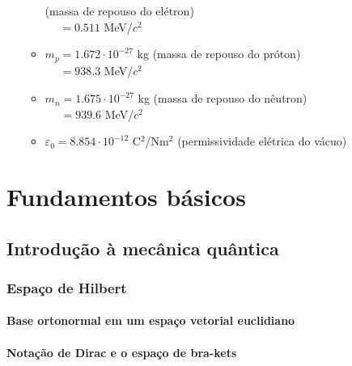 \documentclass{header}
\begin{document}
\begin{itemize}
\begin{itemize}
                \hfill (massa de repouso do elétron) \\
                $\phantom{m_{e}} = 0.511$ MeV/$c^2$
                \item $m_{p} = 1.672\cdot 10^{-27}$ kg 
                \hfill (massa de repouso do próton) \\
                $\phantom{m_{p}} = 938.3$ MeV/$c^2$
                \item $m_{n} = 1.675\cdot 10^{-27}$ kg 
                \hfill (massa de repouso do nêutron) \\
                $\phantom{m_{n}} = 939.6$ MeV/$c^2$
                \item $\varepsilon_{0} = 8.854\cdot 10^{-12}$ C$^2$/Nm$^2$
                \hfill (permissividade elétrica do vácuo)
            \end{itemize}
    \end{itemize}

\mainmatter

\setcounter{page}{0}
\thispagestyle{empty}

\part{Fundamentos básicos}

    
    \chapter{\hspace{0.8cm}Introdução à mecânica quântica}
        
    
        \section{Espaço de Hilbert}
            
        
            \subsection{Base ortonormal em um espaço vetorial euclidiano}
                

            \subsection{Notação de Dirac e o espaço de bra-kets}
                
\end{document}
